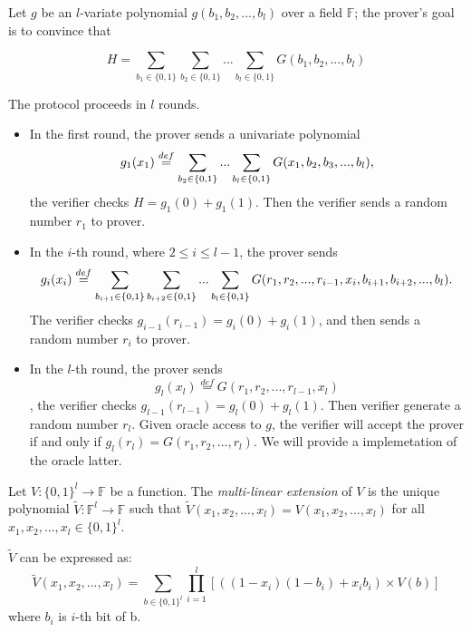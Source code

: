 \begin{definition}
	Let $g$ be an $l$-variate polynomial $g(b_1, b_2, ..., b_{l})$ over a field $\mathbb{F}$; the prover's goal is to convince that 

	$$H=\sum_{b_1\in\{0,1\}}\sum_{b_2\in\{0,1\}}...\sum_{b_{l}\in\{0,1\}}G(b_1,b_2,...,b_{l})$$
\end{definition}

\begin{protocol}
\label{prot::sumcheck}
	The protocol proceeds in $l$ rounds. 
	\begin{itemize}
		\item In the first round, the prover sends a univariate polynomial $$g_1(x_1)\overset{def}{=}\sum_{b_2\in\{0,1\}}...\sum_{b_{l}\in\{0,1\}}G(x_1, b_2, b_3, ..., b_{l})\textnormal{,}$$ the verifier checks $H=g_1(0)+g_1(1)$. Then the verifier sends a random number $r_1$ to prover.
		\item In the $i$-th round, where $2\le i \le l-1$, the prover sends 
		$$g_{i}(x_{i})\overset{def}{=}\sum_{b_{i+1}\in\{0,1\}}\sum_{b_{i+2}\in\{0,1\}}...\sum_{b_{l}\in\{0,1\}}G(r_1, r_2, ..., r_{i-1}, x_{i}, b_{i+1}, b_{i+2}, ..., b_{l})\textnormal{.}$$ 
		The verifier checks $g_{i-1}(r_{i-1})=g_{i}(0)+g_{i}(1)$, and then sends a random number $r_{i}$ to prover.
		\item In the $l$-th round, the prover sends $$g_{l}(x_{l})\overset{def}{=}G(r_1, r_2, ..., r_{l-1}, x_{l})$$, the verifier checks $g_{l-1}(r_{l-1})=g_{l}(0)+g_{l}(1)$. Then verifier generate a random number $r_{l}$. Given oracle access to $g$, the verifier will accept the prover if and only if $g_{l}(r_l) = G(r_1, r_2, ..., r_l)$. We will provide a implemetation of the oracle latter. 
	\end{itemize}
\end{protocol}

\begin{definition}
	Let $V:\{0, 1\}^l \rightarrow \mathbb{F}$ be a function. The \textit{multi-linear extension} of $V$ is the unique polynomial $\tilde{V}: \mathbb{F}^l \rightarrow \mathbb{F}$ such that $\tilde{V}(x_1, x_2, ..., x_{l}) = V(x_1, x_2, ..., x_{l})$ for all $x_1, x_2, ..., x_{l}\in\{0,1\}^l$.
	
	
	$\tilde{V}$ can be expressed as:
	$$\tilde{V}(x_1, x_2, ..., x_{l})=\sum_{b\in\{0,1\}^l}\prod_{i=1}^{l}[((1-x_i)(1-b_i)+x_ib_i) \times V(b)]$$
	where $b_i$ is $i$-th bit of b.

	
\end{definition}



